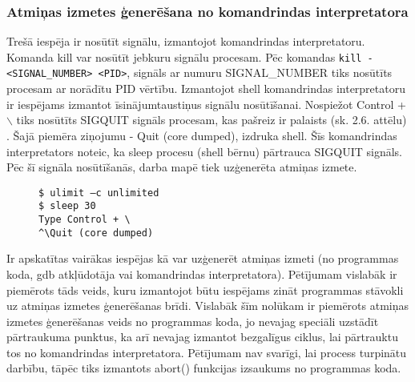 \subsubsection{Atmiņas izmetes ģenerēšana no komandrindas interpretatora}
Trešā iespēja ir nosūtīt signālu, izmantojot komandrindas interpretatoru. 
Komanda kill var nosūtīt jebkuru signālu procesam.
Pēc komandas  \texttt{kill -<SIGNAL\_NUMBER> <PID>}, signāls ar numuru  SIGNAL\_NUMBER tiks nosūtīts procesam ar norādītu PID vērtību.
Izmantojot shell komandrindas interpretatoru ir  iespējams izmantot īsinājumtaustiņus signālu nosūtīšanai. 
Nospiežot Control + $\backslash$ tiks nosūtīts SIGQUIT signāls procesam, kas pašreiz ir palaists (sk. 2.6. attēlu) \cite {nosacijumi}. 
Šajā piemēra ziņojumu - Quit (core dumped), izdruka shell. 
Šīs komandrindas interpretators noteic, ka  sleep procesu (shell bērnu) pārtrauca SIGQUIT signāls. 
Pēc šī signāla nosūtīšanās, darba mapē tiek uzģenerēta atmiņas izmete. 

\begin{figure}[h]
\begin{lstlisting}[style=customgdb]
$ ulimit –c unlimited
$ sleep 30
Type Control + \
^\Quit (core dumped)
\end{lstlisting}
\caption{\textbf{\fontsize{11}{12}\selectfont {Atmiņas izmetes ģenerēšana, izmantojot īsinājumtaustiņus}}}
\end{figure}
 Ir apskatītas vairākas iespējas kā var uzģenerēt atmiņas izmeti (no programmas koda,  gdb atkļūdotāja vai komandrindas interpretatora).
 Pētījumam vislabāk ir piemērots tāds veids, kuru izmantojot būtu iespējams zināt programmas stāvokli uz atmiņas izmetes ģenerēšanas brīdi.
 Vislabāk šīm nolūkam ir piemērots atmiņas izmetes ģenerēšanas veids no programmas koda, jo nevajag speciāli uzstādīt pārtraukuma punktus, ka arī nevajag izmantot bezgalīgus ciklus, lai  pārtrauktu tos no komandrindas interpretatora.
 Pētījumam nav svarīgi, lai process turpinātu darbību, tāpēc tiks izmantots abort() funkcijas izsaukums no programmas koda.
 
 
